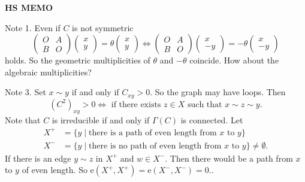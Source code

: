 \documentclass[
]{book}
\theoremstyle{definition}
\theoremstyle{definition}
\theoremstyle{definition}
\theoremstyle{definition}
\theoremstyle{remark}
\begin{document}
\textbf{HS MEMO}

Note 1. Even if \(C\) is not symmetric
\[\begin{pmatrix} O & A \\ B & O \end{pmatrix} \begin{pmatrix}x\\y\end{pmatrix} = \theta \begin{pmatrix}x\\y\end{pmatrix}\Leftrightarrow \begin{pmatrix} O & A \\ B & O \end{pmatrix} \begin{pmatrix}x\\-y\end{pmatrix} = -\theta \begin{pmatrix}x\\-y\end{pmatrix}\]
holds. So the geometric multiplicities of \(\theta\) and \(-\theta\) coincide. How about the algebraic multiplicities?

Note 3. Set \(x \sim y\) if and only if \(C_{xy}>0\). So the graph may have loops. Then
\[(C^2)_{xy} > 0 \Leftrightarrow \textrm{ if there exists } z\in X \textrm{ such that } x\sim z \sim y.\]
Note that \(C\) is irreducible if and only if \(\Gamma(C)\) is connected. Let
\begin{align}
X^+ & = \{y\mid \textrm{there is a path of even length from }x \textrm{ to }y\}\\
X^- & = \{y\mid \textrm{there is no path of even length from }x \textrm{ to }y\} \neq \emptyset.
\end{align}
If there is an edge \(y\sim z\) in \(X^+\) and \(w\in X^-\). Then there would be a path from \(x\) to \(y\) of even length.
So \(\mathrm{e}(X^+, X^+) = \mathrm{e}(X^-, X^-) = 0.\).

\hfill\break
\end{document}
